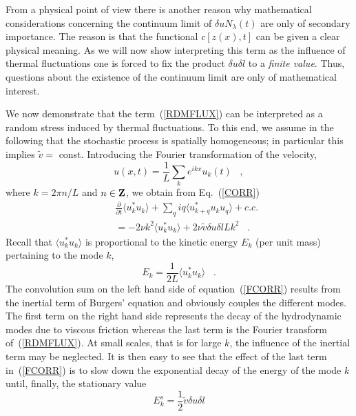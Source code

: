From a physical point of view there is another reason why
mathematical
considerations concerning the continuum limit of
$\delta u N_{\lambda}(t)$
are only of secondary importance.
The reason is that the functional $c[z(x),t]$ 
can be given a clear physical meaning. As we will now
show interpreting this
term as the influence of thermal fluctuations one is forced
to fix the
product $\delta u \delta l$ to a {\em{finite value}}. Thus,
questions about the
existence of the continuum limit are only of mathematical interest.

We now demonstrate that the term~(\ref{RDMFLUX}) can be
interpreted as
a random stress induced by thermal fluctuations. To this end,
we assume in the following that the stochastic process is spatially
homogeneous; in particular this implies $\tilde{v} =$ const.
Introducing the Fourier transformation of the velocity,
\begin{equation}
u(x,t) = \frac{1}{L} \sum_{k} e^{ikx} u_{k}(t) \;\;\; ,
\end{equation}
where $k=2\pi n/L$ and $n \in {\bf{Z}}$, we obtain from
Eq.~(\ref{CORR})
\begin{eqnarray}
& & \frac{\partial}{\partial t} \langle u_{k}^{\ast} u_{k} \rangle
+ \sum_{q} iq \langle u_{k+q}^{\ast} u_{k} u_{q} \rangle + c.c.
\nonumber \\
& & = -2\nu k^2 \langle u_{k}^{\ast} u_{k} \rangle +
2\nu \tilde{v} \delta u \delta l L k^2 \;\;\; .
\label{FCORR}
\end{eqnarray}
Recall that $\langle u_{k}^{\ast} u_{k} \rangle$ is
proportional to the
kinetic energy $E_{k}$ (per unit mass) pertaining to the mode $k$,
\begin{equation}    \label{ESPEC}
E_{k} = \frac{1}{2L} \langle u_{k}^{\ast} u_{k} \rangle \;\;\; .
\end{equation}
The convolution sum on the left hand side of equation~(\ref{FCORR})
results from
the inertial term of Burgers' equation and obviously couples the
different
modes. The first term on the right hand side represents the decay of
the hydrodynamic modes due to viscous friction whereas the last term
is the Fourier transform of~(\ref{RDMFLUX}). At small scales, that
is for
large $k$, the influence of the inertial term may be neglected.
It is then easy
to see that the effect of the last term in~(\ref{FCORR})
is to slow down the exponential decay of
the energy of the mode $k$ until, finally, the stationary value
\begin{equation}
E_{k}^{s} = \frac{1}{2} \tilde{v} \delta u \delta l
\end{equation}

